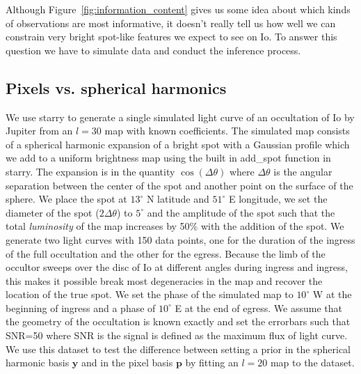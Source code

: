 \documentclass[modern]{aastex62}
\begin{document}
Although Figure~\ref{fig:information_content} gives us some idea about which kinds of observations are most informative, it doesn't really tell us how well we can constrain very bright spot-like features we expect to see on Io.
To answer this question we have to simulate data and conduct the inference process.

\subsection{Pixels vs. spherical harmonics}
\label{ssec:pixels_vs_harmonics}
We use \textsf{starry} to generate a single simulated light curve of an occultation of Io by Jupiter from an $l=30$ map with known coefficients.
The simulated map consists of a spherical harmonic expansion of a bright spot with a Gaussian profile which we add to a uniform brightness map using the built in \textsf{add\_spot} function in \textsf{starry}.
The expansion is in the quantity $\cos(\Delta\theta)$ where $\Delta\theta$ is the angular separation between the center of the spot and another point on the surface of the sphere. 
We place the spot at $13^\circ$ N latitude and $51^\circ$ E longitude, we set the diameter of the spot ($2\Delta\theta$) to $5^\circ$ and the amplitude of the spot such that the total \emph{luminosity} of the map increases by 50\% with the addition of the spot.
We generate two light curves with 150 data points, one for the duration of the ingress of the full occultation and the other for the egress.
Because the limb of the occultor sweeps over the disc of Io at different angles during ingress and ingress, this makes it possible break most degeneracies in the map and recover the location of the true spot.
We set the phase of the simulated map to $10^\circ$ W at the beginning of ingress and a phase of $10^\circ$ E at the end of egress.
We assume that the geometry of the occultation is known exactly and set the errorbars such that SNR=50 where SNR is the signal is defined as the maximum flux of light curve.
    We use this dataset to test the difference between setting a prior in the spherical harmonic basis $\mathbf{y}$ and in the pixel basis $\mathbf{p}$ by fitting an $l=20$ map to the dataset.
\end{document}
